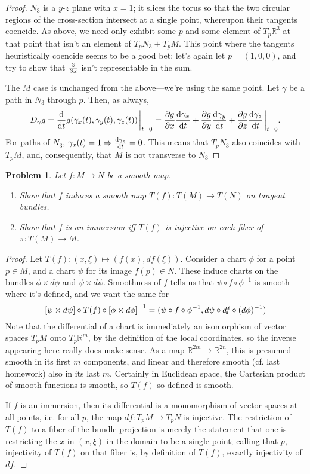 \documentclass{article}
\newtheorem{plm}{Problem}
\begin{document}
\begin{proof}
  $N_{3}$ is a $y$-$z$ plane with $x = 1$; it slices the torus so that the two circular regions of the cross-section
  intersect at a single point, whereupon their tangents coencide.
  As above, we need only exhibit some $p$ and some element of $T_{p}\mathbb{R}^{3}$ at that point that isn't an element
  of $T_{p}N_{3} + T_{p}M$.
  This point where the tangents heuristically coencide seems to be a good bet:
  let's again let $p = (1, 0, 0)$, and try to show that $\pdv{x}$ isn't representable in the sum.

  The $M$ case is unchanged from the above---we're using the same point.
  Let $\gamma$ be a path in $N_{3}$ through $p$.
  Then, as always,
  \[
    D_{\gamma}g = \dv{t}g(\gamma_{x}(t), \gamma_{y}(t), \gamma_{z}(t))\eval_{t = 0}
    = \pdv{g}{x}\dv{\gamma_{x}}{t} + \pdv{g}{y}\dv{\gamma_{y}}{t} + \pdv{g}{z}\dv{\gamma_{z}}{t} \eval_{t = 0}.
  \]
  For paths of $N_{3}$, $\gamma_{x}(t) = 1 \Rightarrow \dv{\gamma_{x}}{t} = 0$.
  This means that $T_{p}N_{3}$ also coincides with $T_{p}M$, and, consequently, that $M$ is not transverse to $N_{3}$
\end{proof}

\begin{plm}
  Let $f: M \to N$ be a smooth map.
  \begin{enumerate}
  \item Show that $f$ induces a smooth map $T(f): T(M) \to T(N)$ on tangent bundles.
  \item Show that $f$ is an immersion iff $T(f)$ is injective on each fiber of $\pi: T(M) \to M$.
  \end{enumerate}
\end{plm}

\begin{proof}
  Let $T(f): (x, \xi) \mapsto (f(x), df(\xi))$.
  Consider a chart $\phi$ for a point $p \in M$, and a chart $\psi$ for its image $f(p) \in N$.
  These induce charts on the bundles $\phi \times d\phi$ and $\psi \times d\psi$.
  Smoothness of $f$ tells us that $\psi \circ f \circ \phi^{-1}$ is smooth where it's defined,
  and we want the same for
  \[
    \qty[\psi \times d\psi] \circ T(f) \circ \qty[\phi \times d\phi]^{-1}
    = (\psi \circ f \circ \phi^{-1}, d\psi \circ df \circ (d\phi)^{-1})
  \]
  Note that the differential of a chart is immediately an isomorphism of vector spaces $T_{p}M$ onto $T_{p}\mathbb{R}^{m}$,
  by the definition of the local coordinates, so the inverse appearing here really does make sense.
  As a map $\mathbb{R}^{2m} \to \mathbb{R}^{2n}$, this is presumed smooth in its first $m$ components,
  and linear and therefore smooth (cf. last homework) also in its last $m$.
  Certainly in Euclidean space, the Cartesian product of smooth functions is smooth, so $T(f)$ so-defined is smooth.

  If $f$ is an immersion, then its differential is a monomorphism of vector spaces at all points,
  i.e. for all $p$, the map $df: T_{p}M \to T_{p}N$ is injective.
  The restriction of $T(f)$ to a fiber of the bundle projection is merely the statement
  that one is restricting the $x$ in $(x, \xi)$ in the domain to be a single point; calling that $p$,
  injectivity of $T(f)$ on that fiber is, by definition of $T(f)$, exactly injectivity of $df$.
\end{proof}
\end{document}

